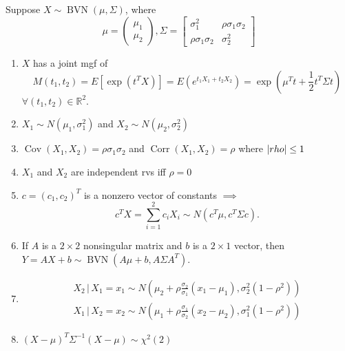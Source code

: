 \documentclass[notoc,notitlepage]{tufte-book}
\DeclareMathOperator{\BVN}{BVN }
\DeclareMathOperator{\Cov}{Cov }
\DeclareMathOperator{\Corr}{Corr }
\begin{document}
\begin{propo}
\label{propo:properties_of_bivariate_normal_distribution}
  Suppose $X \sim \BVN(\mu, \Sigma)$, where
  \begin{equation*}
    \mu = \begin{pmatrix}
      \mu_1 \\ \mu_2
    \end{pmatrix},
    \Sigma = \begin{bmatrix}
      \sigma_1^2 & \rho \sigma_1 \sigma_2 \\
      \rho \sigma_1 \sigma_2 & \sigma_2^2
    \end{bmatrix}
  \end{equation*}
  \begin{enumerate}
    \item $X$ has a joint mgf of
      \begin{equation*}
        M(t_1, t_2) = E[ \exp\left( t^T X \right) ] = E\left( e^{t_1 X_1 + t_2 X_2} \right) = \exp\left( \mu^T t + \frac{1}{2} t^T \Sigma t \right)
      \end{equation*}
      $\forall (t_1, t_2) \in \mathbb{R}^2$.

    \item $X_1 \sim N(\mu_1, \sigma_1^2)$ and $X_2 \sim N(\mu_2, \sigma_2^2)$
    \item $\Cov(X_1, X_2) = \rho \sigma_1 \sigma_2$ and $\Corr(X_1, X_2) = \rho$ where $\left|rho\right| \leq 1$
    \item $X_1$ and $X_2$ are independent rvs iff $\rho = 0$
    \item $c = (c_1, c_2)^T$ is a nonzero vector of constants $\implies$
      \begin{equation*}
        c^T X = \sum_{i=1}^{2} c_i X_i \sim N \left( c^T \mu, c^T \Sigma c \right).
      \end{equation*}
    \item If $A$ is a $2 \times 2$ nonsingular matrix and $b$ is a $2 \times 1$ vector, then $Y = AX + b \sim \BVN\left( A\mu + b, A \Sigma A^T \right)$.
    \item
      \begin{gather*}
        X_2 \, | \, X_1 = x_1 \sim N \left( \mu_2 + \rho \frac{\sigma_2}{\sigma_1}( x_1 - \mu_1 ), \sigma_2^2 (1 - \rho^2) \right) \\
        X_1 \, | \, X_2 = x_2 \sim N \left( \mu_1 + \rho \frac{\sigma_1}{\sigma_2}( x_2 - \mu_2 ), \sigma_1^2 (1 - \rho^2) \right)
      \end{gather*}

    \item $(X - \mu)^T \Sigma^{-1} (X - \mu) \sim \chi^2 (2)$
  \end{enumerate}
\end{propo}
\end{document}
